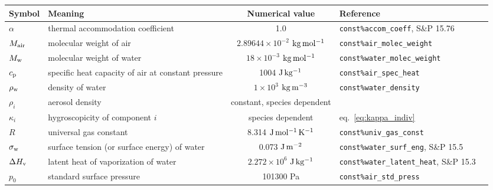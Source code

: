 \documentclass{article}
\begin{document}
\begin{tabular}{lp{4cm}clp{3cm}}
\hline Symbol       & Meaning                                            & Numerical value                                 &  Reference                                \\
\hline
$\alpha$            & thermal accommodation coefficient                  & 1.0                                             & \verb+const%accom_coeff+, S\&P 15.76      \\
$M_{\rm air}$       & molecular weight of air                            & $2.89644 \times 10^{-2}$ $\rm kg \,mol^{-1}$ & \verb+const%air_molec_weight+             \\
$M_{\rm w}$         & molecular weight of water                          & $18 \times 10^{-3}$ $\rm kg \, mol^{-1}$       & \verb+const%water_molec_weight+           \\
$c_{\rm p}$         & specific heat capacity of air at constant pressure & 1004 $\rm J \, kg^{-1}$                        & \verb+const%air_spec_heat+                \\
$\rho_{\rm w}$      & density of water                                   & $1 \times 10^{3}$ $\rm kg \, m^{-3}$           & \verb+const%water_density+                \\ 
$\rho_i$           & aerosol density                                    & constant, species dependent                               &                                           \\
$\kappa_i$          & hygroscopicity of component $i$                    & species dependent                               & eq.~\ref{eq:kappa_indiv}                  \\
$R$                 & universal gas constant                             & 8.314 $\rm J \, mol^{-1} \, K^{-1}$             & \verb+const%univ_gas_const+               \\
$\sigma_{\rm w}$    & surface tension (or surface energy) of water       & 0.073 $\rm J \, m^{-2}$                        & \verb+const%water_surf_eng+, S\&P 15.5    \\
$\Delta H_{\rm v}$  & latent heat of vaporization of water               & $2.272 \times 10^6$ $\rm J \, kg^{-1}$         & \verb+const%water_latent_heat+, S\&P 15.3 \\ 
$p_0$               & standard surface pressure                          & 101300 Pa                                       & \verb+const%air_std_press+                \\

\end{tabular}
\end{document}
